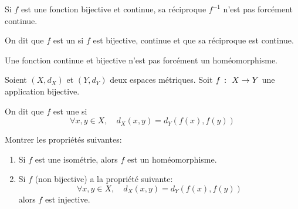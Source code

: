 \begin{remark}
    Si \(f\) est une fonction bijective et continue,
    sa réciproque \(f^{-1}\) n'est pas forcément continue.
\end{remark}

\begin{definition}
    On dit que \(f\) est un 
    si \(f\) est bijective, continue et que sa réciproque est continue.
\end{definition}

\begin{remark}
    Une fonction continue et bijective n'est pas forcément un homéomorphisme.
\end{remark}

\begin{definition}
    Soient \((X, d_X)\) et \((Y, d_Y)\) deux espaces métriques.
    Soit \(f\ \colon\  X \to Y\) une application bijective.

    On dit que \(f\) est une  si
    \begin{equation*}
        \forall x, y \in X, \quad d_X(x, y) = d_Y(f(x), f(y))
    \end{equation*}
\end{definition}

\begin{exercice}
    Montrer les propriétés suivantes:
    \begin{enumerate}[label=(\roman*)] %
        \item Si \(f\) est une isométrie, alors \(f\) est un homéomorphisme.

        \item Si \(f\) (non bijective) a la propriété suivante:
        \begin{equation*}
            \forall x, y \in X, \quad d_X(x, y) = d_Y(f(x), f(y))
        \end{equation*}
        alors \(f\) est injective.
    \end{enumerate}
\end{exercice}